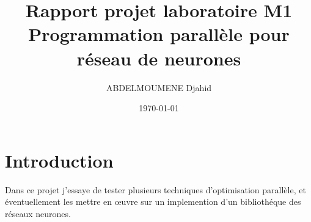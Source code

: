 \documentclass {article}
\title{Rapport projet laboratoire M1\\
Programmation parallèle pour réseau de neurones }
\date{\today}
\author{ABDELMOUMENE Djahid}
\begin{document}
\maketitle
\newpage


\section{Introduction}
Dans ce projet j'essaye de tester plusieurs techniques d'optimisation parallèle, et éventuellement les mettre en œuvre sur un implemention d'un bibliothéque des réseaux neurones.
\end{document}
